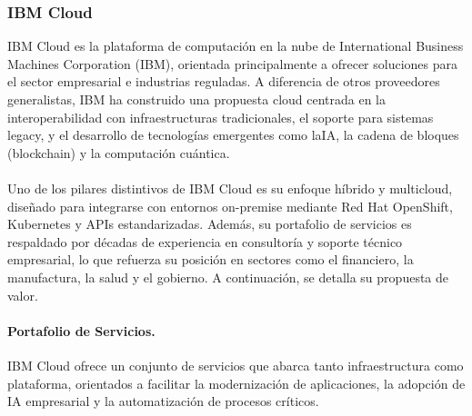 {            \subsubsection{IBM Cloud}
                IBM Cloud es la plataforma de computación en la nube de International Business Machines Corporation (IBM), orientada principalmente a ofrecer soluciones para el sector empresarial e industrias reguladas. A diferencia de otros proveedores generalistas, IBM ha construido una propuesta cloud centrada en la interoperabilidad con infraestructuras tradicionales, el soporte para sistemas legacy, y el desarrollo de tecnologías emergentes como laIA, la cadena de bloques (blockchain) y la computación cuántica. 
                
                \paragraph{}Uno de los pilares distintivos de IBM Cloud es su enfoque híbrido y multicloud, diseñado para integrarse con entornos on-premise mediante Red Hat OpenShift, Kubernetes y APIs estandarizadas. Además, su portafolio de servicios es respaldado por décadas de experiencia en consultoría y soporte técnico empresarial, lo que refuerza su posición en sectores como el financiero, la manufactura, la salud y el gobierno. A continuación, se detalla su propuesta de valor.
                
                \paragraph{Portafolio de Servicios.}
                IBM Cloud ofrece un conjunto de servicios que abarca tanto infraestructura como plataforma, orientados a facilitar la modernización de aplicaciones, la adopción de IA empresarial y la automatización de procesos críticos.
                
}

